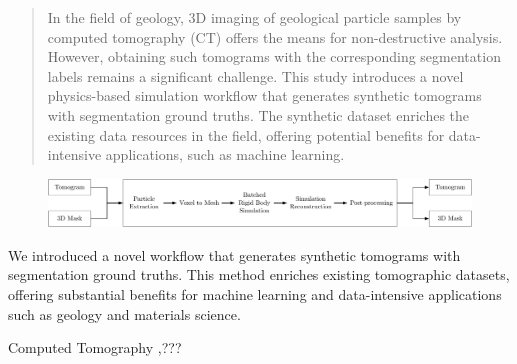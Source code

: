 \documentclass[preprint,12pt]{elsarticle}
\begin{document}
\begin{frontmatter}
\begin{abstract}
In the field of geology, 3D imaging of geological particle samples by computed tomography (CT) offers the means for non-destructive analysis. 
However, obtaining such tomograms with the corresponding segmentation labels remains a significant challenge. 
This study introduces a novel physics-based simulation workflow that generates synthetic tomograms with segmentation ground truths. 
The synthetic dataset enriches the existing data resources in the field, offering potential benefits for data-intensive applications, such as machine learning.
\end{abstract}

\begin{graphicalabstract}
\begin{figure}[H]
    \includegraphics[width=\textwidth]{./figures/pdf/synthesis-workflow.pdf}
\end{figure}
\end{graphicalabstract}

\begin{highlights}
    \item We introduced a novel workflow that generates synthetic tomograms with segmentation ground truths. This method enriches existing tomographic datasets, offering substantial benefits for machine learning and data-intensive applications such as geology and materials science.
\end{highlights}

\begin{keyword}
Computed Tomography \sep ???
\end{keyword}

\end{frontmatter}
\end{document}
